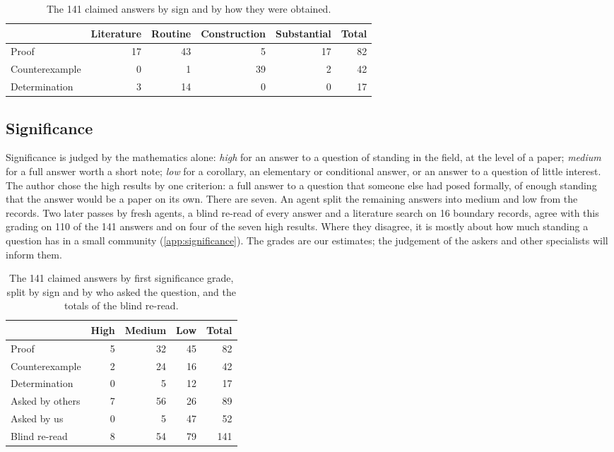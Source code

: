 \documentclass[11pt]{amsart}
\begin{document}
\begin{table}[ht]
  \centering
  \begin{tabular}{lrrrrr}
    \toprule
                   & Literature & Routine & Construction & Substantial & Total \\
    \midrule
    Proof          & 17         & 43      & 5            & 17          & 82    \\
    Counterexample & 0          & 1       & 39           & 2           & 42    \\
    Determination  & 3          & 14      & 0            & 0           & 17    \\
    \bottomrule
  \end{tabular}
  \caption{The 141 claimed answers by sign and by how they were
    obtained.}\label{tab:kind}
\end{table}

\subsection{Significance}
Significance is judged by the mathematics alone: \emph{high} for an answer to a
question of standing in the field, at the level of a paper; \emph{medium} for a
full answer worth a short note; \emph{low} for a corollary, an elementary or
conditional answer, or an answer to a question of little interest. The author
chose the high results by one criterion: a full answer to a question that
someone else had posed formally, of enough standing that the answer would be a
paper on its own. There are seven. An agent split the remaining answers into
medium and low from the records. Two later passes by fresh agents, a blind
re-read of every answer and a literature search on 16 boundary records, agree
with this grading on 110 of the 141 answers and on four of the seven high
results. Where they disagree, it is mostly about how much standing a question
has in a small community (\cref{app:significance}). The grades are our
estimates; the judgement of the askers and other specialists will inform them.

\begin{table}[ht]
  \centering
  \begin{tabular}{lrrrr}
    \toprule
                    & High & Medium & Low & Total \\
    \midrule
    Proof           & 5    & 32     & 45  & 82    \\
    Counterexample  & 2    & 24     & 16  & 42    \\
    Determination   & 0    & 5      & 12  & 17    \\
    \midrule
    Asked by others & 7    & 56     & 26  & 89    \\
    Asked by us     & 0    & 5      & 47  & 52    \\
    \midrule
    Blind re-read   & 8    & 54     & 79  & 141   \\
    \bottomrule
  \end{tabular}
  \caption{The 141 claimed answers by first significance grade, split by sign
    and by who asked the question, and the totals of the blind
    re-read.}\label{tab:sig}
\end{table}
\end{document}
